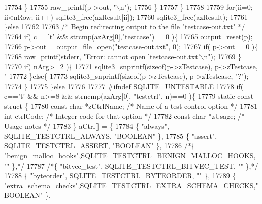 \begin{DoxyCode}
{{{{{{{{{{{{{{{{{{{{{{{{{{{{{{{{{{{{{{{{{{{{{{{{{{{{{{{{{{{{{{{{{{{{{{{{{{{{{{{{{{{{{{{{{{{{{{{{{{{{{{{{{{{{{{{{{{{{{{{{{{{{{{{{{{{{{{{{{{{17754         \}
17755         raw_printf(p->out, \textcolor{stringliteral}{"\(\backslash\)n"});
17756       \}
17757     \}
17758 
17759     \textcolor{keywordflow}{for}(ii=0; ii<nRow; ii++) sqlite3_free(azResult[ii]);
17760     sqlite3_free(azResult);
17761   \}\textcolor{keywordflow}{else}
17762 
17763   \textcolor{comment}{/* Begin redirecting output to the file "testcase-out.txt" */}
17764   \textcolor{keywordflow}{if}( c==\textcolor{charliteral}{'t'} && strcmp(azArg[0],\textcolor{stringliteral}{"testcase"})==0 )\{
17765     output_reset(p);
17766     p->out = output_file_open(\textcolor{stringliteral}{"testcase-out.txt"}, 0);
17767     \textcolor{keywordflow}{if}( p->out==0 )\{
17768       raw_printf(stderr, \textcolor{stringliteral}{"Error: cannot open 'testcase-out.txt'\(\backslash\)n"});
17769     \}
17770     \textcolor{keywordflow}{if}( nArg>=2 )\{
17771       sqlite3_snprintf(\textcolor{keyword}{sizeof}(p->zTestcase), p->zTestcase, \textcolor{stringliteral}{"%
17772     \}\textcolor{keywordflow}{else}\{
17773       sqlite3_snprintf(\textcolor{keyword}{sizeof}(p->zTestcase), p->zTestcase, \textcolor{stringliteral}{"?"});
17774     \}
17775   \}\textcolor{keywordflow}{else}
17776 
17777 \textcolor{preprocessor}{#ifndef SQLITE\_UNTESTABLE}
17778   \textcolor{keywordflow}{if}( c==\textcolor{charliteral}{'t'} && n>=8 && strncmp(azArg[0], \textcolor{stringliteral}{"testctrl"}, n)==0 )\{
17779     \textcolor{keyword}{static} \textcolor{keyword}{const} \textcolor{keyword}{struct }\{
17780        \textcolor{keyword}{const} \textcolor{keywordtype}{char} *zCtrlName;   \textcolor{comment}{/* Name of a test-control option */}
17781        \textcolor{keywordtype}{int} ctrlCode;            \textcolor{comment}{/* Integer code for that option */}
17782        \textcolor{keyword}{const} \textcolor{keywordtype}{char} *zUsage;      \textcolor{comment}{/* Usage notes */}
17783     \} aCtrl[] = \{
17784       \{ \textcolor{stringliteral}{"always"},             SQLITE_TESTCTRL_ALWAYS,        \textcolor{stringliteral}{"BOOLEAN"}        \},
17785       \{ \textcolor{stringliteral}{"assert"},             SQLITE_TESTCTRL_ASSERT,        \textcolor{stringliteral}{"BOOLEAN"}        \},
17786     \textcolor{comment}{/*\{ "benign\_malloc\_hooks",SQLITE\_TESTCTRL\_BENIGN\_MALLOC\_HOOKS, ""       \},*/}
17787     \textcolor{comment}{/*\{ "bitvec\_test",        SQLITE\_TESTCTRL\_BITVEC\_TEST,   ""             \},*/}
17788       \{ \textcolor{stringliteral}{"byteorder"},          SQLITE_TESTCTRL_BYTEORDER,     \textcolor{stringliteral}{""}               \},
17789       \{ \textcolor{stringliteral}{"extra\_schema\_checks"},SQLITE_TESTCTRL_EXTRA_SCHEMA_CHECKS,\textcolor{stringliteral}{"BOOLEAN"}   \},
}}}}}}}}}}}}}}}}}}}}}}}}}}}}}}}}}}}}}}}}}}}}}}}}}}}}}}}}}}}}}}}}}}}}}}}}}}}}}}}}}}}}}}}}}}}}}}}}}}}}}}}}}}}}}}}}}}}}}}}}}}}}}}}}}}}}}}}}}}}}
\end{DoxyCode}
